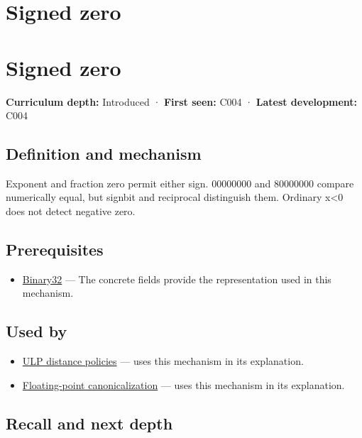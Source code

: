 \hypertarget{appendix-3a048f032c1f}{}
\section*{Signed zero}
\section{Signed zero}\label{signed-zero}

\textbf{Curriculum depth:} Introduced · \textbf{First seen:} C004 · \textbf{Latest development:} C004

\subsection{Definition and mechanism}\label{definition-and-mechanism}

Exponent and fraction zero permit either sign. 00000000 and 80000000 compare numerically equal, but signbit and reciprocal distinguish them. Ordinary x\textless0 does not detect negative zero.

\subsection{Prerequisites}\label{prerequisites}

\begin{itemize}
\tightlist
\item
  \hyperref[appendix-5057f9ad327f]{Binary32} --- The concrete fields provide the representation used in this mechanism.
\end{itemize}

\subsection{Used by}\label{used-by}

\begin{itemize}
\tightlist
\item
  \hyperref[appendix-deca299ae4b8]{ULP distance policies} --- uses this mechanism in its explanation.
\item
  \hyperref[appendix-e90053a4b201]{Floating-point canonicalization} --- uses this mechanism in its explanation.
\end{itemize}

\subsection{Recall and next depth}\label{recall-and-next-depth}

